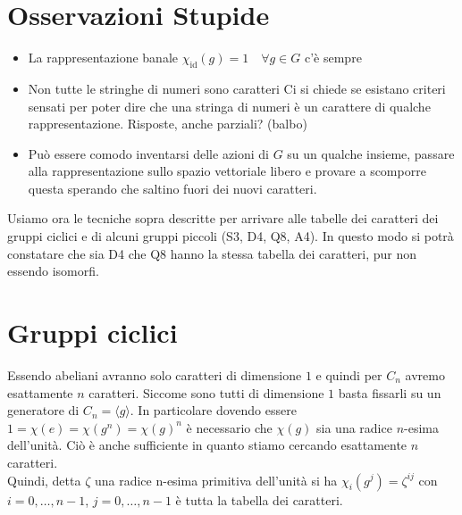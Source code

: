 \documentclass[a4paper,NoNotes,GeneralMath]{stdmdoc}
\newcommand{\gen}[1]{\langle #1 \rangle}
\begin{document}
	\section{Osservazioni Stupide}
	\begin{itemize}
		\item La rappresentazione banale $\chi_{\text{id}}(g) = 1 \quad \forall g \in G$ c'è sempre
		\item Non tutte le stringhe di numeri sono caratteri {\color{blue} Ci si chiede se esistano criteri sensati per poter dire che una stringa di numeri è un carattere di qualche rappresentazione. Risposte, anche parziali? (balbo)}
		\item Può essere comodo inventarsi delle azioni di $G$ su un qualche insieme, passare alla rappresentazione sullo spazio vettoriale libero e provare a scomporre questa sperando che saltino fuori dei nuovi caratteri.
	\end{itemize}

	\vskip 1cm
	\noindent Usiamo ora le tecniche sopra descritte per arrivare alle tabelle dei caratteri dei gruppi ciclici e di alcuni gruppi piccoli (S3, D4, Q8, A4). In questo modo si potrà constatare che sia D4 che Q8 hanno la stessa tabella dei caratteri, pur non essendo isomorfi.
	\vskip 1cm

	\section*{Gruppi ciclici}
	Essendo abeliani avranno solo caratteri di dimensione $1$ e quindi per $C_n$ avremo esattamente $n$ caratteri. Siccome sono tutti di dimensione $1$ basta fissarli su un generatore di $C_n = \gen{g}$. In particolare dovendo essere $1 = \chi(e) = \chi(g^n) = \chi(g)^n$ è necessario che $\chi(g)$ sia una radice $n$-esima dell'unità. Ciò è anche sufficiente in quanto stiamo cercando esattamente $n$ caratteri. \\
	Quindi, detta $\zeta$ una radice n-esima primitiva dell'unità si ha $\chi_i(g^j) = \zeta^{ij}$ con $i = 0, \ldots, n-1$, $j = 0, \ldots, n-1$ è tutta la tabella dei caratteri.
\end{document}

